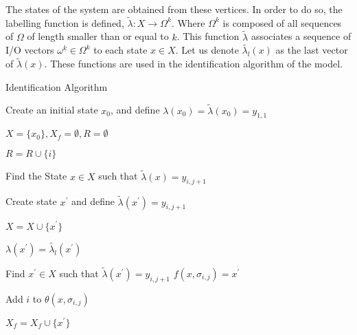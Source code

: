 
The states of the system are obtained from these vertices. In order to
do so, the labelling function is defined, $\tilde{\lambda}:X\rightarrow \Omega^k$. Where $\Omega^k$ is
composed of all sequences of $\Omega$ of length smaller than or equal to $k$. This
function $\tilde{\lambda}$ associates a sequence of I\slash O vectors $\omega^k
\in \Omega^k$ to each state $x \in X$. Let us denote $\tilde{\lambda_l}(x)$
as the last vector of $\tilde{\lambda}(x)$.
These functions are used in the
identification algorithm of the \DAOCT{} model.


\vspace{1cm}
\begin{algorithm2e}[H]
  \caption{Identification Algorithm}\label{alg:identification}
    \BlankLine Create an initial state $x_0$, and define $\lambda(x_0) =
  \tilde{\lambda}(x_0) = y_{1,1}$

  $X = \{ x_0\}, X_f = \emptyset, R = \emptyset$

   { $R = R \cup \{ i \}$
  
     { Find the State $x \in X $ such that
      $\tilde{\lambda}(x) = y_{i,j+1}$

       { Create
        state $x^\prime$ and define $\tilde{\lambda}(x^\prime) = y_{i,j+1}$

        $X = X \cup \{ x^\prime\}$

        $\lambda(x^\prime) = \tilde{\lambda_l}(x^\prime)$

      } { Find $x^\prime \in X$ such that $\tilde{\lambda}(x^\prime) =
        y_{i,j+1}$ } $f(x,\sigma_{i,j}) = x^\prime$

      Add $i$ to $\theta(x,\sigma_{i,j})$

       { $X_f = X_f \cup \{x^\prime\}$ } } }
\end{algorithm2e}

\vspace{1cm}

